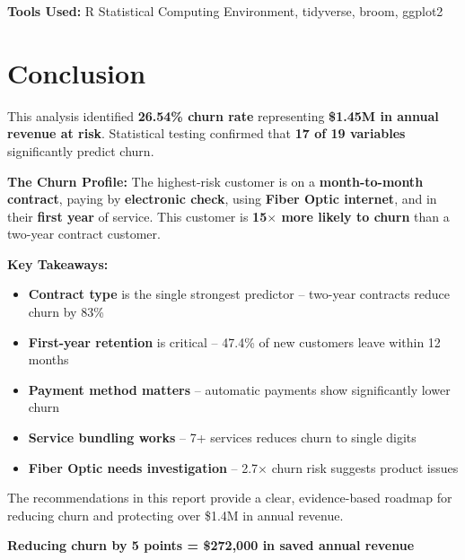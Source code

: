 \documentclass[11pt,a4paper]{article}
\begin{document}
\textbf{Tools Used:} R Statistical Computing Environment, tidyverse, broom, ggplot2

\section{Conclusion}

\begin{tcolorbox}[
    colback=primary!5,
    colframe=primary!50,
    arc=8pt,
    left=15pt,
    right=15pt,
    top=15pt,
    bottom=15pt
]
This analysis identified \textbf{26.54\% churn rate} representing \textbf{\$1.45M in annual revenue at risk}. Statistical testing confirmed that \textbf{17 of 19 variables} significantly predict churn.

\vspace{8pt}

\textbf{The Churn Profile:} The highest-risk customer is on a \textbf{month-to-month contract}, paying by \textbf{electronic check}, using \textbf{Fiber Optic internet}, and in their \textbf{first year} of service. This customer is \textbf{15$\times$ more likely to churn} than a two-year contract customer.

\vspace{8pt}

\textbf{Key Takeaways:}
\begin{itemize}[leftmargin=*]
    \item \textbf{Contract type} is the single strongest predictor -- two-year contracts reduce churn by 83\%
    \item \textbf{First-year retention} is critical -- 47.4\% of new customers leave within 12 months
    \item \textbf{Payment method matters} -- automatic payments show significantly lower churn
    \item \textbf{Service bundling works} -- 7+ services reduces churn to single digits
    \item \textbf{Fiber Optic needs investigation} -- 2.7$\times$ churn risk suggests product issues
\end{itemize}

\vspace{8pt}

The recommendations in this report provide a clear, evidence-based roadmap for reducing churn and protecting over \$1.4M in annual revenue.

\vspace{8pt}

\begin{center}
\textbf{Reducing churn by 5 points = \$272,000 in saved annual revenue}
\end{center}
\end{tcolorbox}
\end{document}
